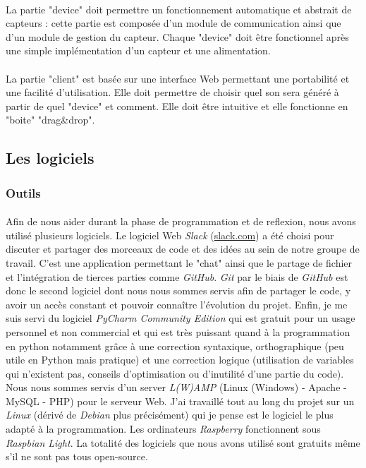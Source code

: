 \documentclass[12pt]{article}
\begin{document}
	\paragraph{}
	La partie "device" doit permettre un fonctionnement automatique et abstrait de capteurs : cette partie est composée d'un module de communication ainsi que d'un module de gestion du capteur. Chaque "device" doit être fonctionnel après une simple implémentation d'un capteur et une alimentation.
	\paragraph{}
	La partie "client" est basée sur une interface Web permettant une portabilité et une facilité d'utilisation. Elle doit permettre de choisir quel son sera généré à partir de quel "device" et comment. Elle doit être intuitive et elle fonctionne en "boite" "drag\&drop".
	\subsection{Les logiciels}
	\subsubsection{Outils}
	\paragraph{}
	Afin de nous aider durant la phase de programmation et de reflexion, nous avons utilisé plusieurs logiciels. Le logiciel Web \textit{Slack} (\url{slack.com}) a été choisi pour discuter et partager des morceaux de code et des idées au sein de notre groupe de travail. C'est une application permettant le "chat" ainsi que le partage de fichier et l'intégration de tierces parties comme \textit{GitHub}. \textit{Git} par le biais de \textit{GitHub} est donc le second logiciel dont nous nous sommes servis afin de partager le code, y avoir un accès constant et pouvoir connaître l'évolution du projet. Enfin, je me suis servi du logiciel \textit{PyCharm Community Edition} qui est gratuit pour un usage personnel et non commercial et qui est très puissant quand à la programmation en python notamment grâce à une correction syntaxique, orthographique (peu utile en Python mais pratique) et une correction logique (utilisation de variables qui n'existent pas, conseils d'optimisation ou d'inutilité d'une partie du code). Nous nous sommes servis d'un server \textit{L(W)AMP} (Linux (Windows) - Apache - MySQL - PHP) pour le serveur Web. J'ai travaillé tout au long du projet sur un \textit{Linux} (dérivé de \textit{Debian} plus précisément) qui je pense est le logiciel le plus adapté à la programmation. Les ordinateurs \textit{Raspberry} fonctionnent sous \textit{Raspbian Light}. La totalité des logiciels que nous avons utilisé sont gratuits même s'il ne sont pas tous open-source.
\end{document}
